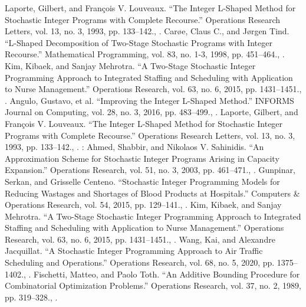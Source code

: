 \documentclass{article}
\theoremstyle{plain}
\theoremstyle{definition}
\begin{document}
\begin{thebibliography}{99}
Laporte, Gilbert, and François V. Louveaux. “The Integer L-Shaped Method for Stochastic Integer Programs with Complete Recourse.” Operations Research Letters, vol. 13, no. 3, 1993, pp. 133–142., . 
Carøe, Claus C., and Jørgen Tind. “L-Shaped Decomposition of Two-Stage Stochastic Programs with Integer Recourse.” Mathematical Programming, vol. 83, no. 1-3, 1998, pp. 451–464., . 
Kim, Kibaek, and Sanjay Mehrotra. “A Two-Stage Stochastic Integer Programming Approach to Integrated Staffing and Scheduling with Application to Nurse Management.” Operations Research, vol. 63, no. 6, 2015, pp. 1431–1451., . 
Angulo, Gustavo, et al. “Improving the Integer L-Shaped Method.” INFORMS Journal on Computing, vol. 28, no. 3, 2016, pp. 483–499., . 
Laporte, Gilbert, and François V. Louveaux. “The Integer L-Shaped Method for Stochastic Integer Programs with Complete Recourse.” Operations Research Letters, vol. 13, no. 3, 1993, pp. 133–142., . 
: Ahmed, Shabbir, and Nikolaos V. Sahinidis. “An Approximation Scheme for Stochastic Integer Programs Arising in Capacity Expansion.” Operations Research, vol. 51, no. 3, 2003, pp. 461–471., . 
Gunpinar, Serkan, and Grisselle Centeno. “Stochastic Integer Programming Models for Reducing Wastages and Shortages of Blood Products at Hospitals.” Computers & Operations Research, vol. 54, 2015, pp. 129–141., .
Kim, Kibaek, and Sanjay Mehrotra. “A Two-Stage Stochastic Integer Programming Approach to Integrated Staffing and Scheduling with Application to Nurse Management.” Operations Research, vol. 63, no. 6, 2015, pp. 1431–1451., . 
 Wang, Kai, and Alexandre Jacquillat. “A Stochastic Integer Programming Approach to Air Traffic Scheduling and Operations.” Operations Research, vol. 68, no. 5, 2020, pp. 1375–1402., . 
Fischetti, Matteo, and Paolo Toth. “An Additive Bounding Procedure for Combinatorial Optimization Problems.” Operations Research, vol. 37, no. 2, 1989, pp. 319–328., . 

\end{thebibliography}
\end{document}
